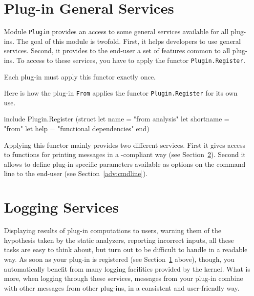 \section{Plug-in General Services}\label{adv:plugin-services}

Module \texttt{Plugin} provides an access to some general
services available for all plug-ins. The goal of this module is twofold. First,
it helps developers to use general \framac services. Second, it provides to the
end-user a set of features common to all plug-ins. To access to these services,
you have to apply the functor
\texttt{Plugin.Register}.

\begin{important}
Each plug-in must apply this functor exactly once.
\end{important}

\begin{example}
Here is how the plug-in \texttt{From} applies the functor
\texttt{Plugin.Register} for its own use.
\begin{ocamlcode}
include Plugin.Register
  (struct
     let name = "from analysis"
     let shortname = "from"
     let help = "functional dependencies"
   end)
\end{ocamlcode}
\end{example}

Applying this functor mainly provides two different services. First it gives
access to functions for printing messages in a \framac-compliant way (see
Section~\ref{adv:log}). Second it allows to define plug-in specific parameters
available as options on the \framac command line to the end-user (see
Section~\ref{adv:cmdline}).


\section{Logging Services}\label{adv:log}

Displaying results of plug-in computations to users, warning them of the
hypothesis taken by the static analyzers, reporting incorrect inputs, all
these tasks are easy to think about, but turn out to be difficult to
handle in a readable way. As soon as your plug-in is registered (see
Section~\ref{adv:plugin-services} above), though, you automatically
benefit from many logging facilities provided by the kernel. What is more,
when logging through these services, messages from your plug-in
combine with other messages from other plug-ins, in a consistent
and user-friendly way.

